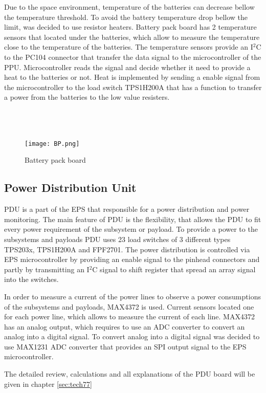   Due to the space environment, temperature of the batteries can decrease bellow the temperature threshold. To avoid the battery temperature drop bellow the limit, was decided to use resistor heaters. Battery pack board has 2 temperature sensors that located under the batteries, which allow to measure the temperature close to the temperature of the batteries. The temperature sensors provide an I$^{2}$C to the PC104 connector that transfer the data signal to the microcontroller of the PPU. Microcontroller reads the signal and decide whether it need to provide a heat to the batteries or not. Heat is implemented by sending a enable signal from the microcontroller to the load switch TPS1H200A that has a function to transfer a power from the batteries to the low value resisters.  \\ \\ \\ \\
  
  
  \begin{figure}[h]
  	\centering
  	\texttt{[image: BP.png]}
  	\caption{Battery pack board}
  	\label{fig: BP}
  \end{figure} 
   
  
  \subsection{Power Distribution Unit}
  PDU is a part of the EPS that responsible for a power distribution and power monitoring. The main feature of PDU is the flexibility, that allows the PDU to fit every power requirement of the subsystem or payload.     To provide a power to the subsystems and payloads PDU uses 23 load switches of 3 different types TPS203x, TPS1H200A and FPF2701. The power distribution is controlled via EPS microcontroller by providing an enable signal to the pinhead connectors and partly by transmitting an I$^2$C signal to shift register that spread an array signal into the switches. 
  
  In order to measure a current of the power lines to observe a power consumptions of the subsystems and payloads, MAX4372 is used. Current sensors located one for each power line, which allows to measure the current of each line. MAX4372 has an analog output, which requires to use an ADC converter to convert an analog into a digital signal. To convert analog into a digital signal was decided to use MAX1231 ADC converter that provides an SPI output signal to the EPS microcontroller. 
  
    
  The detailed review, calculations and all explanations of the PDU board will be given in chapter \ref{sec:tech77}
  
    
  
    

    
  

  
  
  

